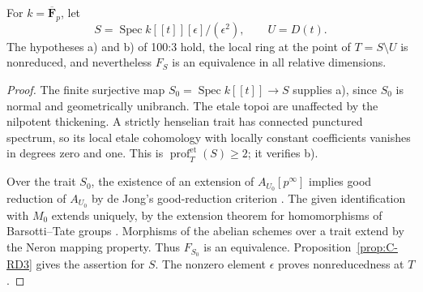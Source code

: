 \begin{corollary}\label{cor:C-RD4}
For $k=\overline{\mathbf F}_p$, let
\[
 S=\operatorname{Spec}k[[t]][\epsilon]/(\epsilon^2),\qquad U=D(t).
\]
The hypotheses a) and b) of 100:3 hold, the local ring at the point of
$T=S\setminus U$ is nonreduced, and nevertheless $F_S$ is an equivalence
in all relative dimensions.
\end{corollary}
\begin{proof}
The finite surjective map $S_0=\operatorname{Spec}k[[t]]\to S$ supplies
a), since $S_0$ is normal and geometrically unibranch. The etale topoi
are unaffected by the nilpotent thickening. A strictly henselian trait
has connected punctured spectrum, so its local etale cohomology with
locally constant coefficients vanishes in degrees zero and one. This
is $\operatorname{prof}^{\mathrm{et}}_T(S)\geq2$; it verifies b).

Over the trait $S_0$, the existence of an extension of $A_{U_0}[p^\infty]$
implies good reduction of $A_{U_0}$ by de Jong's good-reduction criterion
\cite[Theorem~3, citing Theorem~2.5 of the original paper]{deJong1998ICM}.
The given identification with $M_0$ extends uniquely, by the extension
theorem for homomorphisms of Barsotti--Tate groups
\cite[Theorem~2]{deJong1998ICM}. Morphisms of the abelian schemes over a
trait extend by the Neron mapping property. Thus $F_{S_0}$ is an
equivalence. Proposition~\ref{prop:C-RD3} gives the assertion for $S$.
The nonzero element $\epsilon$ proves nonreducedness at $T$.
\end{proof}

